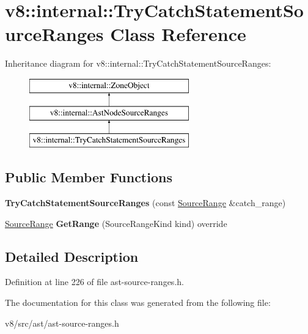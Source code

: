 \hypertarget{classv8_1_1internal_1_1TryCatchStatementSourceRanges}{}\section{v8\+:\+:internal\+:\+:Try\+Catch\+Statement\+Source\+Ranges Class Reference}
\label{classv8_1_1internal_1_1TryCatchStatementSourceRanges}
Inheritance diagram for v8\+:\+:internal\+:\+:Try\+Catch\+Statement\+Source\+Ranges\+:\begin{figure}[H]
\begin{center}
\leavevmode
\includegraphics[height=3.000000cm]{classv8_1_1internal_1_1TryCatchStatementSourceRanges}
\end{center}
\end{figure}
\subsection*{Public Member Functions}
\begin{DoxyCompactItemize}
\item 
\mbox{\label{classv8_1_1internal_1_1TryCatchStatementSourceRanges_a90d2a5d47bbb51b8b874578e0fb93a4f}} 
{\bfseries Try\+Catch\+Statement\+Source\+Ranges} (const \mbox{\hyperlink{structv8_1_1internal_1_1SourceRange}{Source\+Range}} \&catch\+\_\+range)
\item 
\mbox{\label{classv8_1_1internal_1_1TryCatchStatementSourceRanges_aa191361f9b20ddacf27c18c99af6beb4}} 
\mbox{\hyperlink{structv8_1_1internal_1_1SourceRange}{Source\+Range}} {\bfseries Get\+Range} (Source\+Range\+Kind kind) override
\end{DoxyCompactItemize}


\subsection{Detailed Description}


Definition at line 226 of file ast-\/source-\/ranges.\+h.



The documentation for this class was generated from the following file\+:\begin{DoxyCompactItemize}
\item 
v8/src/ast/ast-\/source-\/ranges.\+h\end{DoxyCompactItemize}
